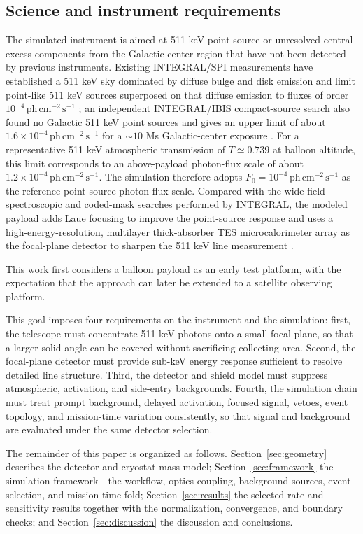 \documentclass[pdflatex,sn-mathphys-num]{sn-jnl}
\newcommand{\phcms}{\,\mathrm{ph\,cm^{-2}\,s^{-1}}}
\newcommand{\fzero}{F_{0}}
\begin{document}
\subsection{Science and instrument requirements}
\label{sec:requirements}

The simulated instrument is aimed at 511 keV point-source or unresolved-central-excess components from the Galactic-center region that have not been detected by previous instruments. Existing INTEGRAL/SPI measurements have established a 511 keV sky dominated by diffuse bulge and disk emission and limit point-like 511 keV sources superposed on that diffuse emission to fluxes of order $10^{-4}\phcms$ \cite{Siegert2016AA,Yoneda2025}; an independent INTEGRAL/IBIS compact-source search also found no Galactic 511 keV point sources and gives an upper limit of about $1.6\times10^{-4}\phcms$ for a $\sim10$ Ms Galactic-center exposure \cite{DeCesare2011}. For a representative 511 keV atmospheric transmission of $T\simeq0.739$ at balloon altitude, this limit corresponds to an above-payload photon-flux scale of about $1.2\times10^{-4}\phcms$. The simulation therefore adopts $\fzero=10^{-4}\phcms$ as the reference point-source photon-flux scale. Compared with the wide-field spectroscopic and coded-mask searches performed by INTEGRAL, the modeled payload adds Laue focusing to improve the point-source response and uses a high-energy-resolution, multilayer thick-absorber TES microcalorimeter array as the focal-plane detector to sharpen the 511 keV line measurement \cite{Shirazi2023,Caputo2017}.

This work first considers a balloon payload as an early test platform, with the expectation that the approach can later be extended to a satellite observing platform.

This goal imposes four requirements on the instrument and the simulation: first, the telescope must concentrate 511 keV photons onto a small focal plane, so that a larger solid angle can be covered without sacrificing collecting area. Second, the focal-plane detector must provide sub-keV energy response sufficient to resolve detailed line structure. Third, the detector and shield model must suppress atmospheric, activation, and side-entry backgrounds. Fourth, the simulation chain must treat prompt background, delayed activation, focused signal, vetoes, event topology, and mission-time variation consistently, so that signal and background are evaluated under the same detector selection.

The remainder of this paper is organized as follows. Section~\ref{sec:geometry} describes the detector and cryostat mass model; Section~\ref{sec:framework} the simulation framework---the workflow, optics coupling, background sources, event selection, and mission-time fold; Section~\ref{sec:results} the selected-rate and sensitivity results together with the normalization, convergence, and boundary checks; and Section~\ref{sec:discussion} the discussion and conclusions.
\end{document}
